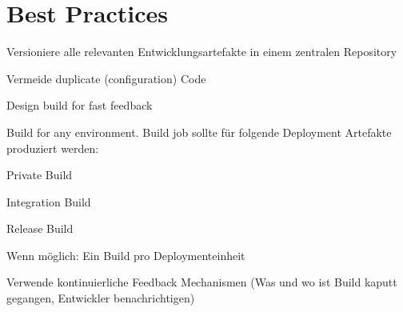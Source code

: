 \section{Best Practices}
\begin{compactitem}
    \item Versioniere alle relevanten Entwicklungsartefakte in einem zentralen Repository
    \item Vermeide duplicate (configuration) Code
    \item Design build for fast feedback
    \item Build for any environment. Build job sollte für folgende Deployment Artefakte produziert werden:
    \begin{compactitem}
        \item Private Build
        \item Integration Build
        \item Release Build
    \end{compactitem}
    \item Wenn möglich: Ein Build pro Deploymenteinheit
    \item Verwende kontinuierliche Feedback Mechanismen (Was und wo ist Build kaputt gegangen, Entwickler
    benachrichtigen)
\end{compactitem}

